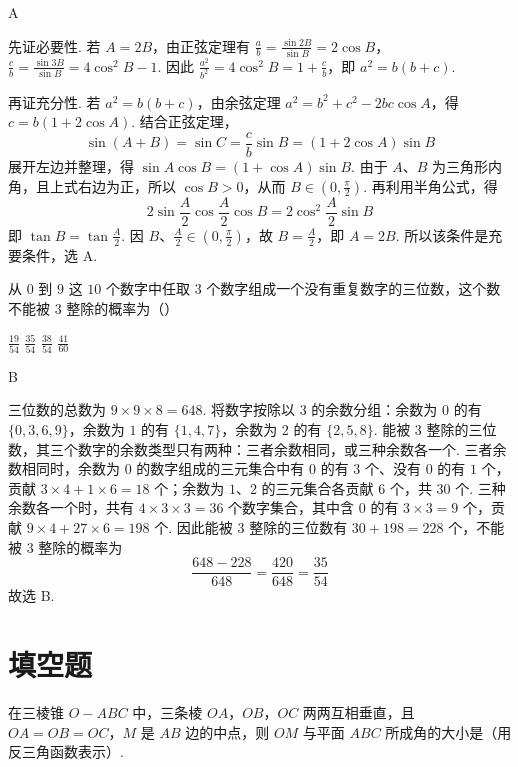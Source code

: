 \begin{answer}
A
\end{answer}

\begin{solution}
先证必要性. 若 \(A=2B\)，由正弦定理有
\(\frac{a}{b}=\frac{\sin2B}{\sin B}=2\cos B\)，
\(\frac{c}{b}=\frac{\sin3B}{\sin B}=4\cos^2B-1\).
因此 \(\frac{a^2}{b^2}=4\cos^2B=1+\frac{c}{b}\)，即 \(a^2=b(b+c)\).

再证充分性. 若 \(a^2=b(b+c)\)，由余弦定理 \(a^2=b^2+c^2-2bc\cos A\)，得 \(c=b(1+2\cos A)\). 结合正弦定理，
\[
\sin(A+B)=\sin C=\frac{c}{b}\sin B=(1+2\cos A)\sin B
\]
展开左边并整理，得 \(\sin A\cos B=(1+\cos A)\sin B\). 由于 \(A\)、\(B\) 为三角形内角，且上式右边为正，所以 \(\cos B>0\)，从而 \(B\in(0,\frac{\pi}{2})\). 再利用半角公式，得
\[
2\sin\frac{A}{2}\cos\frac{A}{2}\cos B=2\cos^2\frac{A}{2}\sin B
\]
即 \(\tan B=\tan\frac{A}{2}\). 因 \(B\)、\(\frac{A}{2}\in(0,\frac{\pi}{2})\)，故 \(B=\frac{A}{2}\)，即 \(A=2B\). 所以该条件是充要条件，选 A.
\end{solution}

\begin{problem}
从 \(0\) 到 \(9\) 这 \(10\) 个数字中任取 \(3\) 个数字组成一个没有重复数字的三位数，这个数不能被 \(3\) 整除的概率为（\quad）

\choices
    {\(\frac{19}{54}\)}
    {\(\frac{35}{54}\)}
    {\(\frac{38}{54}\)}
    {\(\frac{41}{60}\)}
\end{problem}

\begin{answer}
B
\end{answer}

\begin{solution}
三位数的总数为 \(9\times9\times8=648\). 将数字按除以 \(3\) 的余数分组：余数为 \(0\) 的有 \(\{0,3,6,9\}\)，余数为 \(1\) 的有 \(\{1,4,7\}\)，余数为 \(2\) 的有 \(\{2,5,8\}\). 能被 \(3\) 整除的三位数，其三个数字的余数类型只有两种：三者余数相同，或三种余数各一个. 三者余数相同时，余数为 \(0\) 的数字组成的三元集合中有 \(0\) 的有 \(3\) 个、没有 \(0\) 的有 \(1\) 个，贡献 \(3\times4+1\times6=18\) 个；余数为 \(1\)、\(2\) 的三元集合各贡献 \(6\) 个，共 \(30\) 个. 三种余数各一个时，共有 \(4\times3\times3=36\) 个数字集合，其中含 \(0\) 的有 \(3\times3=9\) 个，贡献 \(9\times4+27\times6=198\) 个. 因此能被 \(3\) 整除的三位数有 \(30+198=228\) 个，不能被 \(3\) 整除的概率为
\[
\frac{648-228}{648}=\frac{420}{648}=\frac{35}{54}
\]
故选 B.
\end{solution}

\section{填空题}
\begin{problem}
在三棱锥 \(O-ABC\) 中，三条棱 \(OA\)，\(OB\)，\(OC\) 两两互相垂直，且 \(OA=OB=OC\)，\(M\) 是 \(AB\) 边的中点，则 \(OM\) 与平面 \(ABC\) 所成角的大小是\fillinblank{}（用反三角函数表示）.
\end{problem}

